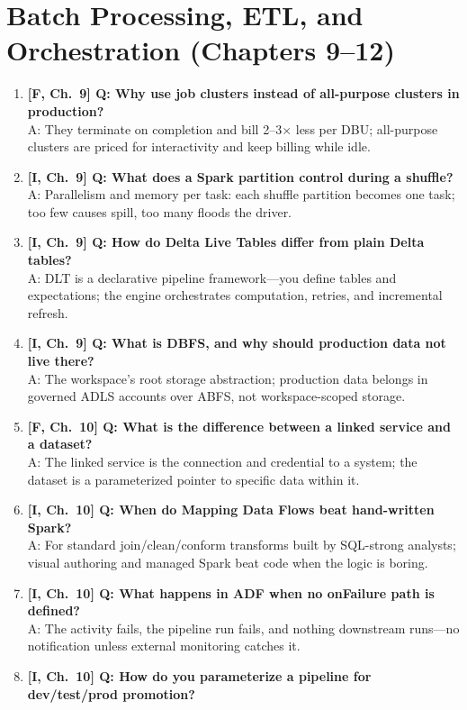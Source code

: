 \section{Batch Processing, ETL, and Orchestration (Chapters 9--12)}

\begin{enumerate}
    \item \textbf{[F, Ch.~9] Q: Why use job clusters instead of all-purpose clusters in production?}\\
    A: They terminate on completion and bill 2--3$\times$ less per DBU; all-purpose clusters are priced for interactivity and keep billing while idle.
    \item \textbf{[I, Ch.~9] Q: What does a Spark partition control during a shuffle?}\\
    A: Parallelism and memory per task: each shuffle partition becomes one task; too few causes spill, too many floods the driver.
    \item \textbf{[I, Ch.~9] Q: How do Delta Live Tables differ from plain Delta tables?}\\
    A: DLT is a declarative pipeline framework---you define tables and expectations; the engine orchestrates computation, retries, and incremental refresh.
    \item \textbf{[I, Ch.~9] Q: What is DBFS, and why should production data not live there?}\\
    A: The workspace's root storage abstraction; production data belongs in governed ADLS accounts over ABFS, not workspace-scoped storage.
    \item \textbf{[F, Ch.~10] Q: What is the difference between a linked service and a dataset?}\\
    A: The linked service is the connection and credential to a system; the dataset is a parameterized pointer to specific data within it.
    \item \textbf{[I, Ch.~10] Q: When do Mapping Data Flows beat hand-written Spark?}\\
    A: For standard join/clean/conform transforms built by SQL-strong analysts; visual authoring and managed Spark beat code when the logic is boring.
    \item \textbf{[I, Ch.~10] Q: What happens in ADF when no onFailure path is defined?}\\
    A: The activity fails, the pipeline run fails, and nothing downstream runs---no notification unless external monitoring catches it.
    \item \textbf{[I, Ch.~10] Q: How do you parameterize a pipeline for dev/test/prod promotion?}\\

\end{enumerate}
